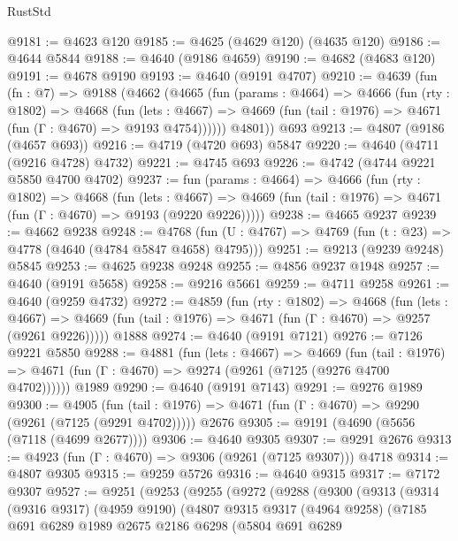 \begin{lexlean}{RustStd}
\begin{coremodule}
@9181 := @4623 @120
@9185 := @4625 (@4629 @120) (@4635 @120)
@9186 := @4644 @5844
@9188 := @4640 (@9186 @4659)
@9190 := @4682 (@4683 @120)
@9191 := @4678 @9190
@9193 := @4640 (@9191 @4707)
@9210 := @4639
    (fun (fn : @7) =>
    @9188
      (@4662
        (@4665
          (fun (params : @4664) =>
          @4666
            (fun (rty : @1802) =>
            @4668
              (fun (lets : @4667) =>
              @4669 (fun (tail : @1976) => @4671 (fun (Γ : @4670) => @9193 @4754))))))
        @4801))
    @693
@9213 := @4807 (@9186 (@4657 @693))
@9216 := @4719 (@4720 @693) @5847
@9220 := @4640 (@4711 (@9216 @4728) @4732)
@9221 := @4745 @693
@9226 := @4742 (@4744 @9221 @5850 @4700 @4702)
@9237 := fun (params : @4664) =>
  @4666
    (fun (rty : @1802) =>
    @4668
      (fun (lets : @4667) =>
      @4669 (fun (tail : @1976) => @4671 (fun (Γ : @4670) => @9193 (@9220 @9226)))))
@9238 := @4665 @9237
@9239 := @4662 @9238
@9248 := @4768 (fun (U : @4767) => @4769 (fun (t : @23) => @4778 (@4640 (@4784 @5847 @4658) @4795)))
@9251 := @9213 (@9239 @9248) @5845
@9253 := @4625 @9238 @9248
@9255 := @4856 @9237 @1948
@9257 := @4640 (@9191 @5658)
@9258 := @9216 @5661
@9259 := @4711 @9258
@9261 := @4640 (@9259 @4732)
@9272 := @4859
    (fun (rty : @1802) =>
    @4668
      (fun (lets : @4667) =>
      @4669 (fun (tail : @1976) => @4671 (fun (Γ : @4670) => @9257 (@9261 @9226)))))
    @1888
@9274 := @4640 (@9191 @7121)
@9276 := @7126 @9221 @5850
@9288 := @4881
    (fun (lets : @4667) =>
    @4669
      (fun (tail : @1976) => @4671 (fun (Γ : @4670) => @9274 (@9261 (@7125 (@9276 @4700 @4702))))))
    @1989
@9290 := @4640 (@9191 @7143)
@9291 := @9276 @1989
@9300 := @4905
    (fun (tail : @1976) => @4671 (fun (Γ : @4670) => @9290 (@9261 (@7125 (@9291 @4702)))))
    @2676
@9305 := @9191 (@4690 (@5656 (@7118 (@4699 @2677))))
@9306 := @4640 @9305
@9307 := @9291 @2676
@9313 := @4923 (fun (Γ : @4670) => @9306 (@9261 (@7125 @9307))) @4718
@9314 := @4807 @9305
@9315 := @9259 @5726
@9316 := @4640 @9315
@9317 := @7172 @9307
@9527 := @9251
    (@9253
      (@9255
        (@9272
          (@9288
            (@9300
              (@9313
                (@9314
                  (@9316 @9317)
                  (@4959 @9190)
                  (@4807
                    @9315
                    @9317
                    (@4964 @9258)
                    (@7185
                      @691
                      @6289
                      @1989
                      @2675
                      @2186
                      @6298
                      (@5804
                        @691
                        @6289

\end{coremodule}
\end{lexlean}
